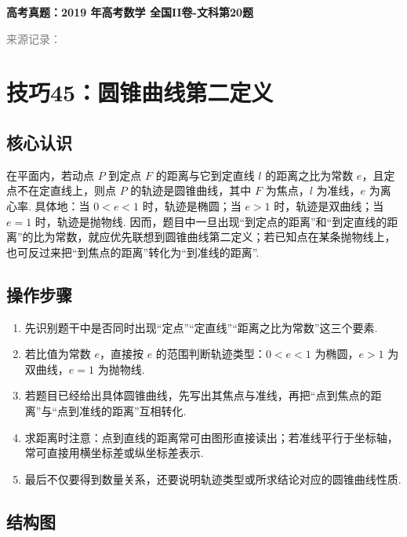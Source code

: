 \documentclass[UTF8,a4paper,11pt]{ctexart}
\newenvironment{gaokao}[1]{\par\medskip\noindent\textbf{高考真题：#1}\par\smallskip}{\par\medskip}
\begin{document}
\begin{gaokao}{2019 年高考数学 全国II卷-文科第20题}
\par\smallskip\textcolor{gray}{\footnotesize 来源记录：\texttt{}}

\end{gaokao}

\clearpage

\section{技巧45：圆锥曲线第二定义}

\subsection*{核心认识}

在平面内，若动点 $P$ 到定点 $F$ 的距离与它到定直线 $l$ 的距离之比为常数 $e$，且定点不在定直线上，则点 $P$ 的轨迹是圆锥曲线，其中 $F$ 为焦点，$l$ 为准线，$e$ 为离心率. 具体地：当 $0<e<1$ 时，轨迹是椭圆；当 $e>1$ 时，轨迹是双曲线；当 $e=1$ 时，轨迹是抛物线. 因而，题目中一旦出现“到定点的距离”和“到定直线的距离”的比为常数，就应优先联想到圆锥曲线第二定义；若已知点在某条抛物线上，也可反过来把“到焦点的距离”转化为“到准线的距离”.

\subsection*{操作步骤}

\begin{enumerate}

\item 先识别题干中是否同时出现“定点”“定直线”“距离之比为常数”这三个要素.

\item 若比值为常数 $e$，直接按 $e$ 的范围判断轨迹类型：$0<e<1$ 为椭圆，$e>1$ 为双曲线，$e=1$ 为抛物线.

\item 若题目已经给出具体圆锥曲线，先写出其焦点与准线，再把“点到焦点的距离”与“点到准线的距离”互相转化.

\item 求距离时注意：点到直线的距离常可由图形直接读出；若准线平行于坐标轴，常可直接用横坐标差或纵坐标差表示.

\item 最后不仅要得到数量关系，还要说明轨迹类型或所求结论对应的圆锥曲线性质.

\end{enumerate}

\subsection*{结构图}
\end{document}
